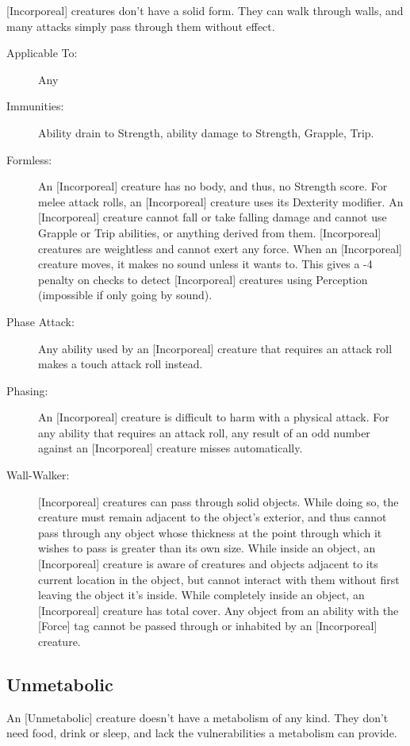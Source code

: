 \documentclass[10pt]{article}
\begin{document}
[Incorporeal] creatures don't have a solid form. They can walk through walls, and many attacks simply pass through them without effect.

\begin{description}
\item[Applicable To:] Any
\item[Immunities:] Ability drain to Strength, ability damage to Strength, Grapple, Trip.
\item[Formless:] An [Incorporeal] creature has no body, and thus, no Strength score. For melee attack rolls, an [Incorporeal] creature uses its Dexterity modifier. An [Incorporeal] creature cannot fall or take falling damage and cannot use Grapple or Trip abilities, or anything derived from them. [Incorporeal] creatures are weightless and cannot exert any force. When an [Incorporeal] creature moves, it makes no sound unless it wants to. This gives a -4 penalty on checks to detect [Incorporeal] creatures using Perception (impossible if only going by sound).
\item[Phase Attack:] Any ability used by an [Incorporeal] creature that requires an attack roll makes a touch attack roll instead.
\item[Phasing:] An [Incorporeal] creature is difficult to harm with a physical attack. For any ability that requires an attack roll, any result of an odd number against an [Incorporeal] creature misses automatically.
\item[Wall-Walker:] [Incorporeal] creatures can pass through solid objects. While doing so, the creature must remain adjacent to the object's exterior, and thus cannot pass through any object whose thickness at the point through which it wishes to pass is greater than its own size. While inside an object, an [Incorporeal] creature is aware of creatures and objects adjacent to its current location in the object, but cannot interact with them without first leaving the object it's inside. While completely inside an object, an [Incorporeal] creature has total cover. Any object from an ability with the [Force] tag cannot be passed through or inhabited by an [Incorporeal] creature.
\end{description}

\subsection{Unmetabolic}

An [Unmetabolic] creature doesn't have a metabolism of any kind. They don't need food, drink or sleep, and lack the vulnerabilities a metabolism can provide.
\end{document}
